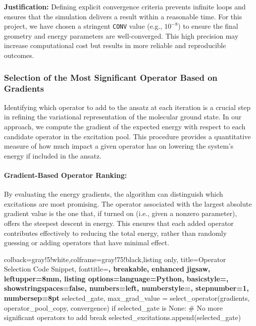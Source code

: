 \textbf{Justification:}  
Defining explicit convergence criteria prevents infinite loops and ensures that the simulation delivers a result within a reasonable time. For this project, we have chosen a stringent \texttt{CONV} value (e.g., \(10^{-8}\)) to ensure the final geometry and energy parameters are well-converged. This high precision may increase computational cost but results in more reliable and reproducible outcomes.

\subsubsection{Selection of the Most Significant Operator Based on Gradients}

Identifying which operator to add to the ansatz at each iteration is a crucial step in refining the variational representation of the molecular ground state. In our approach, we compute the gradient of the expected energy with respect to each candidate operator in the excitation pool. This procedure provides a quantitative measure of how much impact a given operator has on lowering the system's energy if included in the ansatz.

\paragraph{Gradient-Based Operator Ranking:}  
By evaluating the energy gradients, the algorithm can distinguish which excitations are most promising. The operator associated with the largest absolute gradient value is the one that, if turned on (i.e., given a nonzero parameter), offers the steepest descent in energy. This ensures that each added operator contributes effectively to reducing the total energy, rather than randomly guessing or adding operators that have minimal effect.

\begin{tcblisting}{colback=gray!5!white,colframe=gray!75!black,listing only,
    title=Operator Selection Code Snippet, fonttitle=\bfseries, breakable, enhanced jigsaw, leftupper=8mm,
    listing options={language=Python, basicstyle=\ttfamily\small,
    showstringspaces=false, numbers=left, numberstyle=\footnotesize, stepnumber=1, numbersep=8pt}}
selected_gate, max_grad_value = select_operator(gradients, operator_pool_copy, convergence)
if selected_gate is None:
    # No more significant operators to add
    break
selected_excitations.append(selected_gate)
\end{tcblisting}

